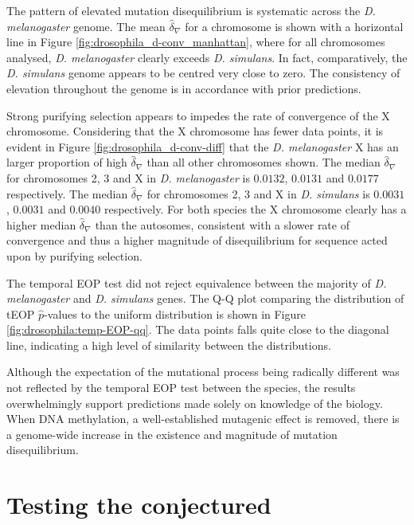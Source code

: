 

The pattern of elevated mutation disequilibrium is systematic across the \textit{D. melanogaster} genome. The mean $\hat \delta_\nabla$ for a chromosome is shown with a horizontal line in Figure \ref{fig:drosophila_d-conv_manhattan}, where for all chromosomes analysed, \textit{D. melanogaster} clearly exceeds \textit{D. simulans}. In fact, comparatively, the \textit{D. simulans} genome appears to be centred very close to zero. The consistency of elevation throughout the genome is in accordance with prior predictions.

Strong purifying selection appears to impedes the rate of convergence of the X chromosome. Considering that the X chromosome has fewer data points, it is evident in Figure \ref{fig:drosophila_d-conv-diff} that the \textit{D. melanogaster} X has an larger proportion of high $\hat \delta_\nabla$ than all other chromosomes shown. The median $\hat \delta_\nabla$ for chromosomes 2, 3 and X in \textit{D. melanogaster} is $0.0132$, $0.0131$ and $0.0177$ respectively. The median $\hat \delta_\nabla$ for chromosomes 2, 3 and X in \textit{D. simulans} is $0.0031$, $0.0031$ and $0.0040$ respectively. For both species the X chromosome clearly has a higher median $\hat \delta_\nabla$ than the autosomes, consistent with a slower rate of convergence and thus a higher magnitude of disequilibrium for sequence acted upon by purifying selection. 



The temporal EOP test did not reject equivalence between the majority of \textit{D. melanogaster} and \textit{D. simulans} genes. The Q-Q plot comparing the distribution of tEOP $\hat p$-values to the uniform distribution is shown in Figure \ref{fig:drosophila:temp-EOP-qq}. The data points falls quite close to the diagonal line, indicating a high level of similarity between the distributions. 



 Although the expectation of the mutational process being radically different was not reflected by the temporal EOP test between the species, the results overwhelmingly support predictions made solely on knowledge of the biology. When DNA methylation, a well-established mutagenic effect is removed, there is a genome-wide increase in the existence and magnitude of mutation disequilibrium. 

\section{Testing the conjectured}

